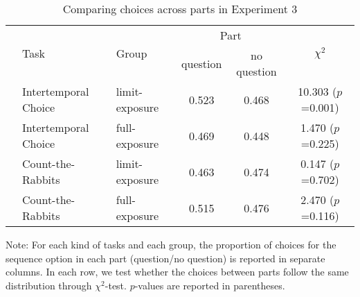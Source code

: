 \documentclass[12pt]{article}
\begin{document}
\begin{table}
    \caption{Comparing choices across parts in Experiment 3}
    \vspace*{12pt}
    \centering

    \begin{tabular}{lllccc}
\hline
 & \multirow{2}{*}{Task} & \multirow{2}{*}{Group} & \multicolumn{2}{c}{Part} & \multicolumn{1}{c}{\multirow{2}{*}{$\chi^2$}} \\ \cline{4-5}
 &                       &                        & question  & no question  &                           \\
\hline
 & Intertemporal Choice & limit-exposure & 0.523 & 0.468 & 10.303 ($p$=0.001) \\
 & Intertemporal Choice & full-exposure & 0.469 & 0.448 & 1.470 ($p$=0.225) \\
 & Count-the-Rabbits & limit-exposure & 0.463 & 0.474 & 0.147 ($p$=0.702) \\
 & Count-the-Rabbits & full-exposure & 0.515 & 0.476 & 2.470 ($p$=0.116) \\
\hline
\end{tabular}

    \vspace*{4pt}
    \centering
    \begin{minipage}{0.95\textwidth}
    {\par\footnotesize Note: For each kind of tasks and each group, the proportion of choices for the sequence option in each part (question/no question) is reported in separate columns. In each row, we test whether the choices between parts follow the same distribution through $\chi^2$-test. $p$-values are reported in parentheses. }
    \end{minipage}
    \label{tab:exp3_chi_test}
\end{table}
\end{document}
